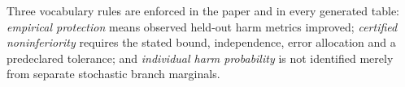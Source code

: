 Three vocabulary rules are enforced in the paper and in every generated table:
\emph{empirical protection} means observed held-out harm metrics improved;
\emph{certified noninferiority} requires the stated bound, independence, error
allocation and a predeclared tolerance; and \emph{individual harm probability}
is not identified merely from separate stochastic branch marginals.
